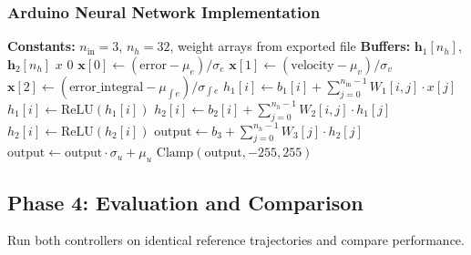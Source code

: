 \subsubsection{Arduino Neural Network Implementation}

\begin{algorithm}[htbp]
\caption{Neural Network Inference on Microcontroller}
\label{alg:nn_inference}
\begin{algorithmic}[1]
\State \textbf{Constants:} $n_{\text{in}} = 3$, $n_h = 32$, weight arrays from exported file
\State \textbf{Buffers:} $\mathbf{h}_1[n_h]$, $\mathbf{h}_2[n_h]$
\State
{}
        \State \Return $x$
    \Else
        \State \Return $0$
    \EndIf
\EndFunction
\State
{}
    \State {}
    \State $\mathbf{x}[0] \gets (\text{error} - \mu_e) / \sigma_e$
    \State $\mathbf{x}[1] \gets (\text{velocity} - \mu_v) / \sigma_v$
    \State $\mathbf{x}[2] \gets (\text{error\_integral} - \mu_{\int e}) / \sigma_{\int e}$
    \State
    \State {}
        \State $h_1[i] \gets b_1[i] + \sum_{j=0}^{n_{\text{in}}-1} W_1[i, j] \cdot x[j]$
        \State $h_1[i] \gets \text{ReLU}(h_1[i])$
    \EndFor
    \State
    \State {}
        \State $h_2[i] \gets b_2[i] + \sum_{j=0}^{n_h-1} W_2[i, j] \cdot h_1[j]$
        \State $h_2[i] \gets \text{ReLU}(h_2[i])$
    \EndFor
    \State
    \State {}
    \State $\text{output} \gets b_3 + \sum_{j=0}^{n_h-1} W_3[j] \cdot h_2[j]$
    \State
    \State {}
    \State $\text{output} \gets \text{output} \cdot \sigma_u + \mu_u$
    \State \Return $\text{Clamp}(\text{output}, -255, 255)$
\EndFunction
\end{algorithmic}
\end{algorithm}

\subsection{Phase 4: Evaluation and Comparison}

Run both controllers on identical reference trajectories and compare performance.

